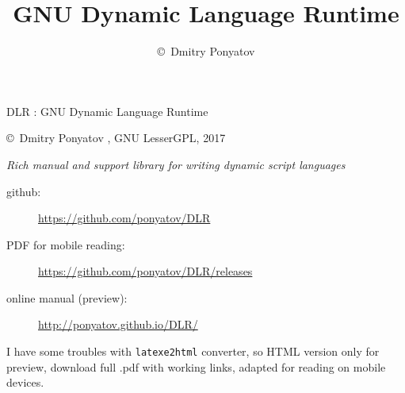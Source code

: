 

\title{GNU Dynamic Language Runtime}
\author{\copyright\ Dmitry Ponyatov }


\maketitle

{\Large DLR : GNU Dynamic Language Runtime}

\bigskip
\copyright\ Dmitry Ponyatov  , GNU LesserGPL, 2017

\bigskip
\emph{Rich manual and support library for writing dynamic script languages}  
\bigskip

\begin{description}
\item[github:] \url{https://github.com/ponyatov/DLR}
\item[PDF for mobile reading:] \url{https://github.com/ponyatov/DLR/releases}
\item[online manual (preview):] \url{http://ponyatov.github.io/DLR/}
\end{description}

\noindent
I have some troubles with \verb|latexe2html| converter, so HTML version only for
preview, download full .pdf with working links, adapted for reading on mobile
devices.

\tableofcontents










